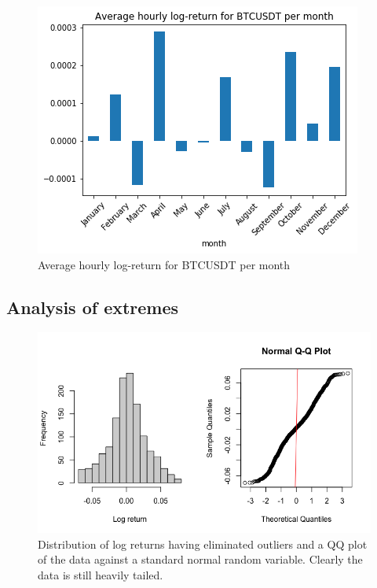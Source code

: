 \documentclass[twoside]{report}
\begin{document}
\begin{spacing}{1}
\begin{figure}[!htbp]
    \centering
    \includegraphics[scale = 0.5]{Images/Average hourly log-return for BTCUSDT per month.png}
    \caption{Average hourly log-return for BTCUSDT per month}
    \label{Average hourly log-return for BTCUSDT per month}
\end{figure}


\subsection{Analysis of extremes}

\begin{figure}[!htbp]
    \centering
    \includegraphics[width=\linewidth, scale=0.8]{Extremal Modelling/distplots_sans_outliers.png}
    \caption{Distribution of log returns having eliminated outliers and a QQ plot of the data against a standard normal random variable. Clearly the data is still heavily tailed.}
    \label{fig:distplots_sans_outliers}
\end{figure}



\end{spacing}
\end{document}
